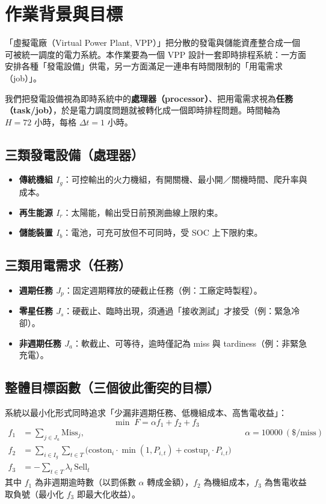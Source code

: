 \documentclass[12pt,a4paper,fontset=none]{ctexart}
\begin{document}
\section{作業背景與目標}
「虛擬電廠（Virtual Power Plant, VPP）」把分散的發電與儲能資產整合成一個可被統一調度的電力系統。本作業要為一個 VPP 設計一套即時排程系統：一方面安排各種「發電設備」供電，另一方面滿足一連串有時間限制的「用電需求（job）」。

我們把發電設備視為即時系統中的\textbf{處理器（processor）}、把用電需求視為\textbf{任務（task/job）}，於是電力調度問題就被轉化成一個即時排程問題。時間軸為 $H=72$ 小時，每格 $\Delta t = 1$ 小時。

\subsection{三類發電設備（處理器）}
\begin{itemize}
  \item \textbf{傳統機組 $I_g$}：可控輸出的火力機組，有開關機、最小開／關機時間、爬升率與成本。
  \item \textbf{再生能源 $I_r$}：太陽能，輸出受日前預測曲線上限約束。
  \item \textbf{儲能裝置 $I_b$}：電池，可充可放但不可同時，受 SOC 上下限約束。
\end{itemize}

\subsection{三類用電需求（任務）}
\begin{itemize}
  \item \textbf{週期任務 $J_p$}：固定週期釋放的硬截止任務（例：工廠定時製程）。
  \item \textbf{零星任務 $J_s$}：硬截止、臨時出現，須通過「接收測試」才接受（例：緊急冷卻）。
  \item \textbf{非週期任務 $J_a$}：軟截止、可等待，逾時僅記為 miss 與 tardiness（例：非緊急充電）。
\end{itemize}

\subsection{整體目標函數（三個彼此衝突的目標）}
系統以最小化形式同時追求「少漏非週期任務、低機組成本、高售電收益」：
\begin{equation}
\min\; F = \alpha f_1 + f_2 + f_3
\end{equation}
\begin{align}
f_1 &= \sum_{j\in J_a}\mathrm{Miss}_j, & &\alpha = 10000\ (\text{\$/miss}) \\
f_2 &= \sum_{i\in I_g}\sum_{t\in T}\Big(\mathrm{coston}_i\cdot\min(1,P_{i,t}) + \mathrm{costup}_i\cdot P_{i,t}\Big) \\
f_3 &= -\sum_{t\in T}\lambda_t\,\mathrm{Sell}_t
\end{align}
其中 $f_1$ 為非週期逾時數（以罰係數 $\alpha$ 轉成金額），$f_2$ 為機組成本，$f_3$ 為售電收益取負號（最小化 $f_3$ 即最大化收益）。
\end{document}
